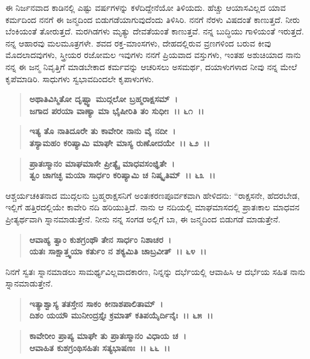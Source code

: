 ಈ ನಿರ್ಜನವಾದ ಕಾಡಿನಲ್ಲಿ ಎಷ್ಟು ವರ್ಷಗಳನ್ನು ಕಳೆದಿದ್ದೇನೆಯೋ ತಿಳಿಯದು. ಹೆಚ್ಚು ಆಯಾಸವಿಲ್ಲದ ಯಾವ ಕರ್ಮದಿಂದ ನನಗೆ ಈ ಜನ್ಮದಿಂದ ಬಿಡುಗಡೆಯಾಗುವುದೆಂದು ತಿಳಿಸಿರಿ. ನನಗೆ ನೆರಳು ವಿಷದಂತೆ ಕಾಣುತ್ತದೆ. ನೀರು ಬೆಂಕಿಯಂತೆ ತೋರುತ್ತದೆ. ಮರಗಿಡಗಳು ಮೃತ್ಯು ದೇವತೆಯಂತೆ ಕಾಣುತ್ತವೆ. ನನ್ನ ಬುದ್ಧಿಯು ಗಾಳಿಯಂತೆ ಇರುತ್ತದೆ. ನನ್ನ ಆಹಾರವು ಮಲಮೂತ್ರಗಳೇ. ಶವದ ರಕ್ತ-ಮಾಂಸಗಳು, ದೇಹದಲ್ಲಿರುವ ವ್ರಣಗಳಿಂದ ಬರುವ ಕೀವು ಮೊದಲಾದವುಗಳು, ಸ್ತ್ರೀಯರ ರಜೋಮಲ ಇವುಗಳು ನನಗೆ ಪ್ರಿಯವಾದ ವಸ್ತುಗಳು, ಇಂತಹ ಅಶುಚಿಯಾದ ನಾನು ನನ್ನ ಈ ಜನ್ಮ ನಿವೃತ್ತಿಗೆ ಮಾಡಬೇಕಾದ ಕರ್ಮವನ್ನು ಆಚರಿಸಲು ಅಸಮರ್ಥ, ದಯಾಳುಗಳಾದ ನೀವು ನನ್ನ ಮೇಲೆ ಕೃಪೆಮಾಡಿರಿ. ಸಾಧುಗಳು ಸ್ವಭಾವದಿಂದಲೇ ಕೃಪಾಳುಗಳು.

\begin{verse}
\textbf{ಅಥಾತಿವಿಸ್ಮಿತೋ ದೃಷ್ಟ್ವಾ ಮುದ್ಗಲೋ ಬ್ರಹ್ಮರಾಕ್ಷಸಮ್~।}\\\textbf{ಜಗಾದ ಪರಯಾ ವಾಣ್ಯಾ ಮಾ ಭೈಷೀರಿತಿ ತಂ ಸುಧೀಃ~।। ೬೧~।।} 
\end{verse}

\begin{verse}
\textbf{ಇತ್ಯ ತೊ ನಾತಿದೂರೇ ತು ಕಾವೇರೀ ನಾನು ವೈ ನದೀ~।}\\\textbf{ತಸ್ಯಾಮಹಂ ಕರಿಷ್ಯಾಮಿ ಮಾಘೇ ಮಾಸ್ಯ ರುಣೋದಯೇ~।। ೬೨~।। }
\end{verse}

\begin{verse}
\textbf{ಪ್ರಾತಃಸ್ಮಾನಂ ಮಾಘಮಾಸೇ ಪ್ರೀತ್ಯೈ ಮಾಧವಸಂಜ್ಞಿತೇ~।}\\\textbf{ತ್ವಂ ಚಾಗಚ್ಛ ಮಯಾ ಸಾರ್ಧಂ ಕರಿಷ್ಯಾಮಿ ಚ ನಿಷ್ಕೃತಿಮ್~।। ೬೩~।।}
\end{verse}

ಆಶ್ಚರ್ಯಚಕಿತನಾದ ಮುದ್ಗಲನು ಬ್ರಹ್ಮರಾಕ್ಷಸನಿಗೆ ಅಂತಃಕರಣಪೂರ್ವಕವಾಗಿ ಹೇಳಿದನು: “ರಾಕ್ಷಸನೇ, ಹೆದರಬೇಡ, ಇಲ್ಲಿಗೆ ಹತ್ತಿರದಲ್ಲಿಯೇ ಕಾವೇರಿ ನದಿ ಹರಿಯುತ್ತಿದೆ. ನಾನು ಆ ನದಿಯಲ್ಲಿ ಮಾಘಮಾಸದಲ್ಲಿ ಪ್ರಾತಃಕಾಲ ಮಾಧವನ ಪ್ರೀತ್ಯರ್ಥವಾಗಿ ಸ್ನಾನಮಾಡುತ್ತೇನೆ. ನೀನು ನನ್ನ ಸಂಗಡ ಅಲ್ಲಿಗೆ ಬಾ, ಈ ಜನ್ಮದಿಂದ ಬಿಡುಗಡೆ ಮಾಡುತ್ತೇನೆ.

\begin{verse}
\textbf{ಆವಾಹ್ಯ ತ್ವಾಂ ಕುಶಗ್ರಂಥೌ ತೇನ ಸಾರ್ಧಂ ನಿಶಾಚರ~।}\\\textbf{ಯತಃ ಸಾಕ್ಷಾತ್ತ್ವಯಾ ಕರ್ತುಂ ನ ಶಕ್ಯಮಿತಿ ಚಾಬ್ರವೀತ್~।। ೬೪~।।}
\end{verse}

ನಿನಗೆ ಸ್ವತಃ ಸ್ನಾನಮಾಡಲು ಸಾಮರ್ಥ್ಯವಿಲ್ಲವಾದಕಾರಣ, ನಿನ್ನನ್ನು ದರ್ಭೆಯಲ್ಲಿ ಆವಾಹಿಸಿ ಆ ದರ್ಭೆಯ ಸಹಿತ ನಾನು ಸ್ನಾನಮಾಡುತ್ತೇನೆ.

\begin{verse}
\textbf{ಇತ್ಯಾಶ್ವಾಸ್ಯ ತತಸ್ತೇನ ಸಾಕಂ ಕೀನಾಶಪಾಲಿತಾಮ್~।}\\\textbf{ದಿಶಂ ಯಯೌ ಮುನೀಂದ್ರಸ್ತೈಃ ಕ್ರಮಾತ್ ಕತಿಪಯೈರ್ದಿನೈಃ~।। ೬೫~।। }
\end{verse}

\begin{verse}
\textbf{ಕಾವೇರೀಂ ಪ್ರಾಪ್ಯ ಮಾಘೇ ತು ಪ್ರಾತಃಸ್ಮಾನಂ ವಿಧಾಯ ಚ~।}\\\textbf{ಆವಾಹಿತ ಕುಶಗ್ರಂಥಿಸಹಿತಃ ಸತ್ಯಭಾಷಣಃ~।। ೬೬~।। }
\end{verse}


